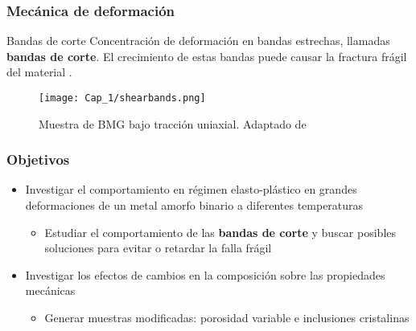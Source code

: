 \begin{frame}
 \frametitle{Mec\'anica de deformaci\'on}
 \begin{block}{Bandas de corte}
 Concentraci\'on de deformaci\'on en bandas estrechas, llamadas \textbf{bandas de corte}.
 El crecimiento de estas bandas puede causar la fractura fr\'agil del material \cite{schuh07}.
 \end{block}
 \begin{figure}
 \centering
 \texttt{[image: Cap\_1/shearbands.png]}
 \caption{Muestra de BMG bajo tracci\'on uniaxial. Adaptado de \cite{albe13}}
\end{figure}
\end{frame}

\begin{frame}
 \frametitle{Objetivos}
\begin{itemize}
 \item Investigar el comportamiento en r\'egimen elasto-pl\'astico en grandes deformaciones de un metal amorfo binario a diferentes temperaturas
 \begin{itemize}
  \item Estudiar el comportamiento de las \textbf{bandas de corte} y buscar posibles soluciones para evitar o retardar la falla fr\'agil
 \end{itemize}
 \item Investigar los efectos de cambios en la composici\'on sobre las propiedades mec\'anicas
 \begin{itemize}
  \item Generar muestras modificadas: porosidad variable e inclusiones cristalinas
 \end{itemize}
\end{itemize}
\end{frame}

